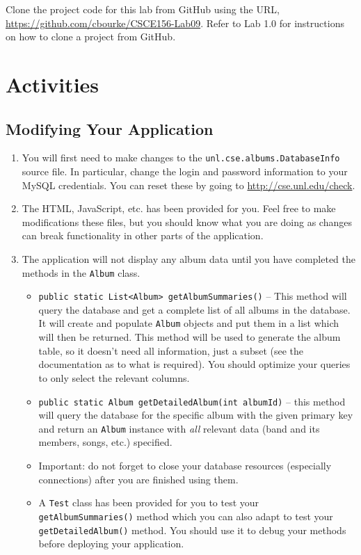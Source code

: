 \documentclass[12pt]{scrartcl}
\begin{document}
Clone the project code for this lab from GitHub using the URL, 
\url{https://github.com/cbourke/CSCE156-Lab09}.  Refer to Lab 
1.0 for instructions on how to clone a project from GitHub.	

\section*{Activities}

\subsection*{Modifying Your Application}

\begin{enumerate}
  \item You will first need to make changes to the 
  	\texttt{unl.cse.albums.DatabaseInfo} source file.  In 
	particular, change the login and password information to your
	MySQL credentials.  You can reset these by going to \url{http://cse.unl.edu/check}.
  \item The HTML, JavaScript, etc. has been provided for you.  Feel
    free to make modifications these files, but you should know what
    you are doing as changes can break functionality in other parts
    of the application.
  \item The application will not display any album data until you have
	completed the methods in the \texttt{Album} class.
	\begin{itemize}
	  \item \texttt{public static List<Album> getAlbumSummaries()} -- 
	  This method will query the database and get a complete list of all 
	  albums in the database.  It will create and populate 
	  \texttt{Album} objects and put them in a list 
	  which will then be returned.  This method will be used to 
	  generate the album table, so it doesn't need all information, just
	  a subset (see the documentation as to what is required).  
	  You should optimize your queries to only select the relevant columns.

	  \item \texttt{public static Album getDetailedAlbum(int albumId)} --
	  this method will query the database for the specific album with 
	  the given primary key and return an \texttt{Album}
	  instance with \emph{all} relevant data (band and its members, 
	  songs, etc.) specified. 

	  \item Important: do not forget to close your database resources 
      (especially connections) after you are finished using them.  
 	  \item A \texttt{Test} class has been provided for you 
      to test your \texttt{getAlbumSummaries()} method
      which you can also adapt to test your 
      \texttt{getDetailedAlbum()} method.  You should use 
      it to debug your methods before deploying your application.
    \end{itemize}
\end{enumerate}
    
\end{document}
